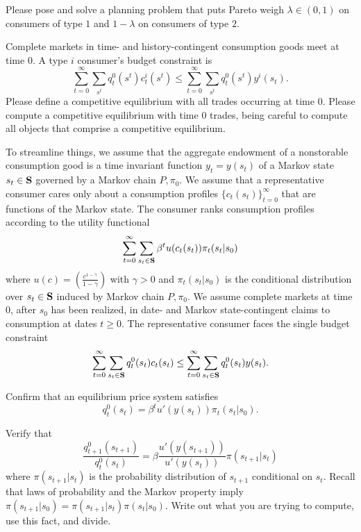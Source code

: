 \medskip
{} Please pose and solve a planning problem that puts Pareto weigh $\lambda \in (0,1)$ on consumers
of type 
$1$ and $ 1 - \lambda$ on consumers of type $2$.
 
\medskip
{} Complete markets in time- and  history-contingent consumption goods
meet at time $0$.
A type $i$ consumer's budget constraint is
$$ \sum_{t=0}^\infty \sum_{s^t} q_t^0(s^t) c^i_t(s^t) \leq  \sum_{t=0}^\infty \sum_{s^t} q_t^0(s^t) y^i(s_t) . $$Please define a competitive equilibrium with all trades occurring at time $0$.
\medskip
{} Please compute a competitive equilibrium with time $0$ trades, being careful to compute
all objects that comprise a competitive equilibrium.

\medskip
{} 
\medskip
\noindent To streamline things, we assume that the aggregate endowment of a nonstorable consumption good is a time invariant function $y_t = y(s_t)$
of a Markov state $s_t \in {\bf S}$ governed by a Markov chain $P, \pi_0$.  We assume that a representative
consumer cares only about a consumption profiles $\{c_t(s_t)\}_{t=0}^\infty$ that are functions of the Markov state.
The consumer ranks consumption profiles according to the utility functional
$$ \sum_{t=0}^\infty \sum_{s_t \in {\bf S}} \beta^t u(c_t(s_t)) \pi_t(s_t | s_0) $$
where $u(c) = \left({\frac{c^{1-\gamma}}{1 - \gamma}}\right)$ with $\gamma >0$ and $\pi_t(s_t|s_0)$ is the conditional distribution over $s_t \in {\bf S}$ induced by Markov chain  $P, \pi_0$.
We assume complete markets at time $0$, after $s_0$ has been realized, in date- and Markov state-contingent
claims to consumption at dates $t \geq 0$.  The representative consumer faces the single budget constraint
$$ \sum_{t=0}^\infty \sum_{s_t \in {\bf S}} q_t^0 (s_t) c_t(s_t) \leq  \sum_{t=0}^\infty \sum_{s_t \in {\bf S}}
q_t^0 (s_t) y(s_t)  .
$$

\medskip
{} Confirm that an equilibrium price system satisfies
$$ q_t^0(s_t) = \beta^t u'(y(s_t)) \pi_t(s_t | s_0) .$$

\medskip
{} Verify that
$$ {\frac{q^0_{t+1}(s_{t+1})}{q^0_t(s_t)}} = \beta {\frac{u'(y(s_{t+1}))}{u'(y(s_t))}} \pi(s_{t+1}| s_t) $$
where $\pi(s_{t+1}| s_t)$ is the probability distribution of $s_{t+1}$ conditional on $s_t$.
\medskip
{} Recall that laws of probability and the Markov property imply $\pi(s_{t+1} | s_0) = \pi(s_{t+1}| s_t) \pi(s_t | s_0)$. 
Write out what you are trying to compute, use this fact, and divide.

